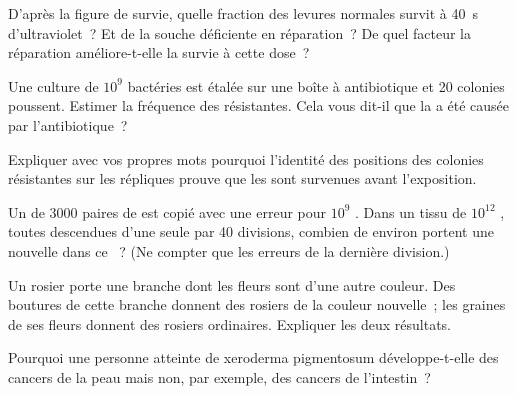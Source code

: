 \begin{exercise}[$\star\star$]\label{exo:g11:mutations:6}
D'après la figure de survie, quelle fraction des levures normales
survit à \qty{40}{s} d'ultraviolet~? Et de la souche déficiente en
réparation~? De quel facteur la réparation améliore-t-elle la survie à
cette dose~?
\end{exercise}

\begin{exercise}[$\star\star$]\label{exo:g11:mutations:7}
Une culture de $10^9$ bactéries est étalée sur une boîte à
antibiotique et 20 colonies poussent. Estimer la fréquence des 
résistantes. Cela vous dit-il que la  a été causée par
l'antibiotique~?
\end{exercise}

\begin{exercise}[$\star\star$]\label{exo:g11:mutations:8}
Expliquer avec vos propres mots pourquoi l'identité des positions des
colonies résistantes sur les répliques prouve que les  sont
survenues avant l'exposition.
\end{exercise}

\begin{exercise}[$\star\star$]\label{exo:g11:mutations:9}
Un  de \num{3000} paires de  est copié avec une erreur pour
$10^9$ . Dans un tissu de $10^{12}$ , toutes
descendues d'une seule  par 40 divisions, combien de 
environ portent une  nouvelle dans ce ~? (Ne compter que
les erreurs de la dernière division.)
\end{exercise}

\begin{exercise}[$\star\star$]\label{exo:g11:mutations:10}
Un rosier porte une branche dont les fleurs sont d'une autre couleur.
Des boutures de cette branche donnent des rosiers de la couleur
nouvelle~; les graines de ses fleurs donnent des rosiers ordinaires.
Expliquer les deux résultats.
\end{exercise}

\begin{exercise}[$\star\star$]\label{exo:g11:mutations:11}
Pourquoi une personne atteinte de xeroderma pigmentosum développe-t-elle
des cancers de la peau mais non, par exemple, des cancers de
l'intestin~?
\end{exercise}


